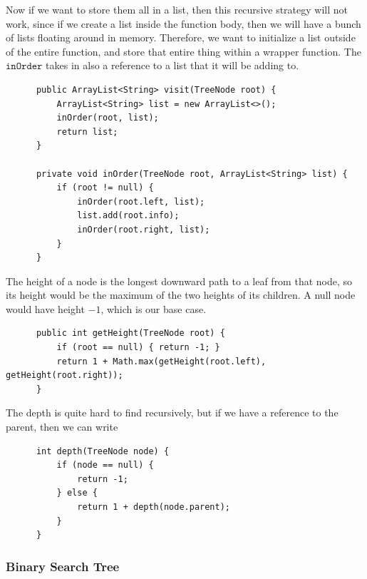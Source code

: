 \documentclass{article}
\begin{document}
      \begin{theorem}
      Now if we want to store them all in a list, then this recursive strategy will not work, since if we create a list inside the function body, then we will have a bunch of lists floating around in memory. Therefore, we want to initialize a list outside of the entire function, and store that entire thing within a wrapper function. The $\texttt{inOrder}$ takes in also a reference to a list that it will be adding to. 
      \begin{lstlisting}
      public ArrayList<String> visit(TreeNode root) {
          ArrayList<String> list = new ArrayList<>(); 
          inOrder(root, list); 
          return list; 
      }

      private void inOrder(TreeNode root, ArrayList<String> list) {
          if (root != null) {
              inOrder(root.left, list); 
              list.add(root.info); 
              inOrder(root.right, list); 
          }
      }
      \end{lstlisting}
      \end{theorem}

      \begin{definition}
      The height of a node is the longest downward path to a leaf from that node, so its height would be the maximum of the two heights of its children. A null node would have height $-1$, which is our base case. 
      \begin{lstlisting}
      public int getHeight(TreeNode root) {
          if (root == null) { return -1; }
          return 1 + Math.max(getHeight(root.left), getHeight(root.right)); 
      }
      \end{lstlisting}
      \end{definition}

      \begin{definition}
      The depth is quite hard to find recursively, but if we have a reference to the parent, then we can write 
      \begin{lstlisting}
      int depth(TreeNode node) {
          if (node == null) {
              return -1;
          } else {
              return 1 + depth(node.parent);
          }
      }
      \end{lstlisting}
      \end{definition}

    \subsubsection{Binary Search Tree}
\end{document}
